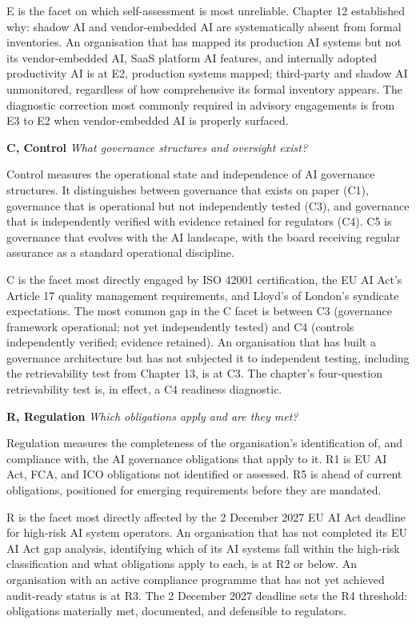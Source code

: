 E is the facet on which self-assessment is most unreliable. Chapter 12 established why: shadow AI and vendor-embedded AI are systematically absent from formal inventories. An organisation that has mapped its production AI systems but not its vendor-embedded AI, SaaS platform AI features, and internally adopted productivity AI is at E2, production systems mapped; third-party and shadow AI unmonitored, regardless of how comprehensive its formal inventory appears. The diagnostic correction most commonly required in advisory engagements is from E3 to E2 when vendor-embedded AI is properly surfaced.

\textbf{C, Control} \emph{What governance structures and oversight exist?}

Control measures the operational state and independence of AI governance structures. It distinguishes between governance that exists on paper (C1), governance that is operational but not independently tested (C3), and governance that is independently verified with evidence retained for regulators (C4). C5 is governance that evolves with the AI landscape, with the board receiving regular assurance as a standard operational discipline.

C is the facet most directly engaged by ISO 42001 certification, the EU AI Act's Article 17 quality management requirements, and Lloyd's of London's syndicate expectations. The most common gap in the C facet is between C3 (governance framework operational; not yet independently tested) and C4 (controls independently verified; evidence retained). An organisation that has built a governance architecture but has not subjected it to independent testing, including the retrievability test from Chapter 13, is at C3. The chapter's four-question retrievability test is, in effect, a C4 readiness diagnostic.

\textbf{R, Regulation} \emph{Which obligations apply and are they met?}

Regulation measures the completeness of the organisation's identification of, and compliance with, the AI governance obligations that apply to it. R1 is EU AI Act, FCA, and ICO obligations not identified or assessed. R5 is ahead of current obligations, positioned for emerging requirements before they are mandated.

R is the facet most directly affected by the 2 December 2027 EU AI Act deadline for high-risk AI system operators. An organisation that has not completed its EU AI Act gap analysis, identifying which of its AI systems fall within the high-risk classification and what obligations apply to each, is at R2 or below. An organisation with an active compliance programme that has not yet achieved audit-ready status is at R3. The 2 December 2027 deadline sets the R4 threshold: obligations materially met, documented, and defensible to regulators.

